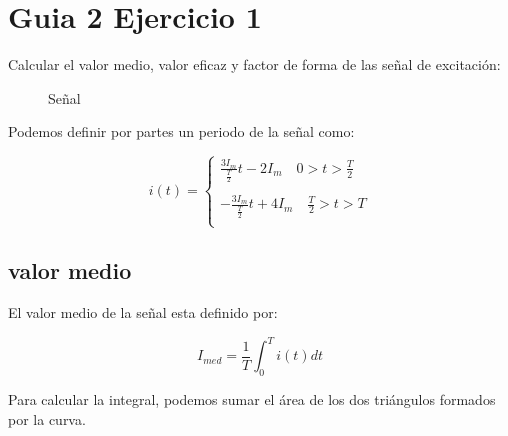 \chapter{Guia 2 Ejercicio 1}

Calcular el valor medio, valor eficaz y factor de forma de las señal de excitación:


\begin{figure}[h]
  \centering
  \caption{Señal}
\end{figure}

Podemos definir por partes un periodo de la señal como:

\begin{equation}
i(t) =
  \begin{cases}
    \frac{3I_m}{\frac{T}{2}} t - 2I_m \quad 0>t>\frac{T}{2}\\\\
    -\frac{3I_m}{\frac{T}{2}} t + 4I_m \quad \frac{T}{2}>t>T\\
  \end{cases}
\end{equation}

\section{valor medio}

El valor medio de la señal esta definido por:

\begin{equation}
  I_{med}= \frac{1}{T} \int_0^T i(t) dt
\end{equation}

Para calcular la integral, podemos sumar el área de los dos triángulos formados por la curva.

